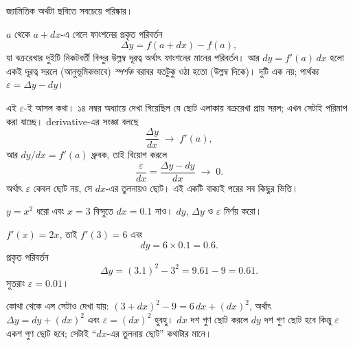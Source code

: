 \documentclass[11pt]{article}
\begin{document}
জ্যামিতিক অর্থটা ছবিতে সবচেয়ে পরিষ্কার।

\begin{center}
\end{center}

$a$ থেকে $a+dx$-এ গেলে ফাংশনের প্রকৃত পরিবর্তন
\[
  \Delta y = f(a+dx) - f(a) ,
\]
 যা বক্ররেখার দুইটি নিকটবর্তী বিন্দুর উল্লম্ব দূরত্ব অর্থাৎ ফাংশনের মানের পরিবর্তন। আর $dy = f'(a)\,dx$ হলো একই দূরত্ব সরলে (আনুভূমিকভাবে)
\emph{স্পর্শক} বরাবর যতটুকু ওঠা হতো (উল্লম্ব দিকে)। দুটি এক নয়; পার্থক্য
$\varepsilon = \Delta y - dy$।

এই $\varepsilon$-ই আসল কথা। ১৪ নম্বর অধ্যায়ে দেখা গিয়েছিল যে ছোট এলাকায়
বক্ররেখা প্রায় সরল; এখন সেটাই পরিমাপ করা যাচ্ছে। derivative-এর সংজ্ঞা বলছে
\[
  \frac{\Delta y}{dx} \;\longrightarrow\; f'(a) ,
\]
আর $dy/dx = f'(a)$ ধ্রুবক, তাই বিয়োগ করলে
\[
  \frac{\varepsilon}{dx} = \frac{\Delta y - dy}{dx}
  \;\longrightarrow\; 0 .
\]
অর্থাৎ $\varepsilon$ কেবল ছোট নয়, সে $dx$-এর তুলনায়ও ছোট। এই একটি বাক্যই
পরের সব কিছুর ভিত্তি।

\begin{example}
$y = x^{2}$ ধরো এবং $x = 3$ বিন্দুতে $dx = 0.1$ নাও। $dy$, $\Delta y$ ও
$\varepsilon$ নির্ণয় করো।
\end{example}

\begin{solbox}
$f'(x) = 2x$, তাই $f'(3) = 6$ এবং
\[
  dy = 6 \times 0.1 = 0.6 .
\]
প্রকৃত পরিবর্তন
\[
  \Delta y = (3.1)^{2} - 3^{2} = 9.61 - 9 = 0.61 .
\]
সুতরাং $\varepsilon = 0.01$।

কোথা থেকে এল সেটাও দেখা যায়: $(3+dx)^{2} - 9 = 6\,dx + (dx)^{2}$, অর্থাৎ
$\Delta y = dy + (dx)^{2}$ এবং $\varepsilon = (dx)^{2}$ হুবহু। $dx$ দশ গুণ
ছোট করলে $dy$ দশ গুণ ছোট হবে কিন্তু $\varepsilon$ একশ গুণ ছোট হবে; সেটাই
``$dx$-এর তুলনায় ছোট'' কথাটার মানে।
\end{solbox}
\end{document}
